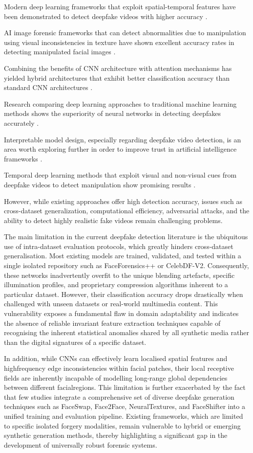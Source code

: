 \documentclass[conference]{IEEEtran}
\begin{document}
Modern deep learning frameworks that exploit spatial-temporal features have been demonstrated to detect deepfake videos with higher accuracy \cite{b16,b18}.

AI image forensic frameworks that can detect abnormalities due to manipulation using visual inconsistencies in texture have shown excellent accuracy rates in detecting manipulated facial images \cite{b17,b22}.

Combining the benefits of CNN architecture with attention mechanisms has yielded hybrid architectures that exhibit better classification accuracy than standard CNN architectures \cite{b19,b26}.

Research comparing deep learning approaches to traditional machine learning methods shows the superiority of neural networks in detecting deepfakes accurately \cite{b20}.

Interpretable model design, especially regarding deepfake video detection, is an area worth exploring further in order to improve trust in artificial intelligence frameworks \cite{b21}.

Temporal deep learning methods that exploit visual and non-visual cues from deepfake videos to detect manipulation show promising results \cite{b23,b24,b25}.

However, while existing approaches offer high detection accuracy, issues such as cross-dataset generalization, computational efficiency, adversarial attacks, and the ability to detect highly realistic fake videos remain challenging problems.


The main limitation in the current deepfake detection literature is the ubiquitous use
of intra-dataset evaluation protocols, which greatly hinders cross-dataset generalisation.
Most existing models are trained, validated, and tested within a single isolated repository
such as FaceForensics++ or CelebDF-V2. Consequently, these networks inadvertently
overfit to the unique blending artefacts, specific illumination profiles, and proprietary
compression algorithms inherent to a particular dataset. However, their classification accuracy drops drastically when challenged with unseen datasets or real-world multimedia
content. This vulnerability exposes a fundamental flaw in domain adaptability and indicates the absence of reliable invariant feature extraction techniques capable of recognising
the inherent statistical anomalies shared by all synthetic media rather than the digital
signatures of a specific dataset.

In addition, while CNNs can effectively learn localised spatial features and highfrequency edge inconsistencies within facial patches, their local receptive fields are inherently incapable of modelling long-range global dependencies between different facialregions. This limitation is further exacerbated by the fact that few studies integrate a
comprehensive set of diverse deepfake generation techniques such as FaceSwap, Face2Face,
NeuralTextures, and FaceShifter into a unified training and evaluation pipeline. Existing
frameworks, which are limited to specific isolated forgery modalities, remain vulnerable
to hybrid or emerging synthetic generation methods, thereby highlighting a significant
gap in the development of universally robust forensic systems.
\end{document}
